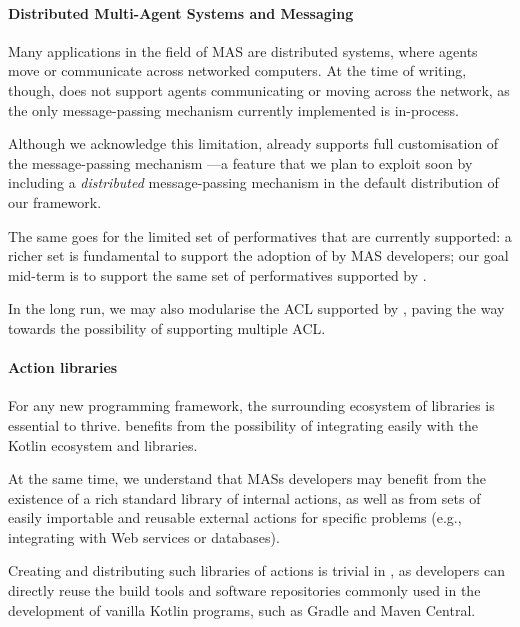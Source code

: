 \paragraph{Distributed Multi-Agent Systems and Messaging}

Many applications in the field of \ac{MAS} are distributed systems,
where agents move or communicate across networked computers.
%
At the time of writing, though,
\jakta{} does not support agents communicating or moving across the network,
as the only message-passing mechanism currently implemented is in-process.

Although we acknowledge this limitation,
\jakta{} already supports full customisation of the message-passing mechanism%
---a feature that we plan to exploit soon
by including a \emph{distributed} message-passing mechanism in the
default distribution of our framework.

The same goes for the limited set of performatives that are currently supported:
a richer set is fundamental to support the adoption of \jakta{} by \ac{MAS} developers;
our goal mid-term is to support the same set of performatives supported by \jason{}. %

In the long run,
we may also modularise the \ac{ACL} supported by \jakta{},
paving the way towards the possibility of supporting multiple \ac{ACL}.


\paragraph{Action libraries}

For any new programming framework, the surrounding ecosystem of libraries is essential to thrive.
%
\jakta{} benefits from the possibility of integrating easily with the Kotlin ecosystem and libraries.

At the same time,
we understand that \acp{MAS} developers may benefit from the existence
of a rich standard library of internal actions,
as well as from sets of easily importable and reusable external actions
for specific problems (e.g., integrating with Web services or databases).

Creating and distributing such libraries of actions is trivial in \jakta{},
as developers can directly reuse the build tools and software repositories commonly used
in the development of vanilla Kotlin programs,
such as Gradle and Maven Central.

